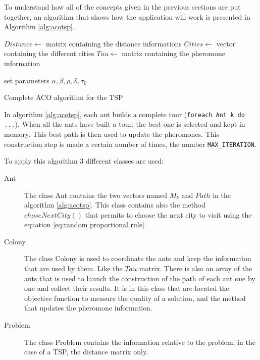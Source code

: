 To understand how all of the concepts given in the previous sections are put together, an algorithm that shows how the application will work is presented in Algorithm \ref{alg:acotsp}.

\begin{algorithm}
$Distance \leftarrow$ matrix containing the distance informations\;
$Cities \leftarrow$ vector containing the different cities\;
$Tau \leftarrow$ matrix containing the pheromone information\; 

set parameters $\alpha, \beta, \rho, \mathcal{E}, \tau_0$\;

\caption{Complete ACO algorithm for the TSP}\label{alg:acotsp}
\end{algorithm}

In algorithm \ref{alg:acotsp}, each ant builds a complete tour (\texttt{foreach Ant k do ...}). When all the ants have built a tour, the best one is selected and kept in memory. This best path is then used to update the pheromones. This construction step is made a certain number of times, the number \texttt{MAX\_ITERATION}.

To apply this algorithm 3 different classes are used: 
\begin{description}
	\item[Ant] The class Ant contains the two vectors named $M_k$ and $Path$ in the algorithm \ref{alg:acotsp}. This class contains also the method $choseNextCity()$ that permits to choose the next city to visit using the equation \ref{eq:random proportional rule}.
	\item[Colony] The class Colony is used to coordinate the ants and keep the information that are used by them. Like the $Tau$ matrix. There is also an array of the ants that is used to launch the construction of the path of each ant one by one and collect their results. It is in this class that are located the objective function to measure the quality of a solution, and the method that updates the pheromone information.
	\item[Problem] The class Problem contains the information relative to the problem, in the case of a TSP, the distance matrix only.
\end{description}


